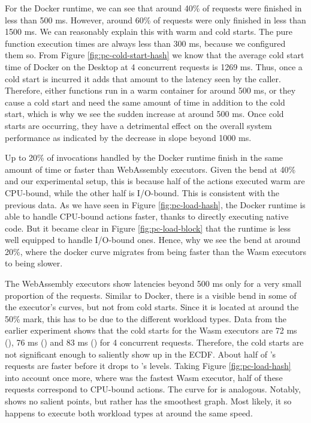 For the Docker runtime, we can see that around 40\% of requests were finished in less than 500 ms. However, around 60\% of requests were only finished in less than 1500 ms. We can reasonably explain this with warm and cold starts. The pure function execution times are always less than 300 ms, because we configured them so. From Figure \ref{fig:pc-cold-start-hash} we know that the average cold start time of Docker on the Desktop at 4 concurrent requests is 1269 ms. Thus, once a cold start is incurred it adds that amount to the latency seen by the caller. Therefore, either functions run in a warm container for around 500 ms, or they cause a cold start and need the same amount of time in addition to the cold start, which is why we see the sudden increase at around 500 ms. Once cold starts are occurring, they have a detrimental effect on the overall system performance as indicated by  the decrease in slope beyond 1000 ms.

Up to 20\% of invocations handled by the Docker runtime finish in the same amount of time or faster than WebAssembly executors. Given the bend at 40\% and our experimental setup, this is because half of the actions executed warm are CPU-bound, while the other half is I/O-bound. This is consistent with the previous data. As we have seen in Figure \ref{fig:pc-load-hash}, the Docker runtime is able to handle CPU-bound actions faster, thanks to directly executing native code. But it became clear in Figure \ref{fig:pc-load-block} that the runtime is less well equipped to handle I/O-bound ones. Hence, why we see the bend at around 20\%, where the docker curve migrates from being faster than the Wasm executors to being slower.

The WebAssembly executors show latencies beyond 500 ms only for a very small proportion of the requests.
Similar to Docker, there is a visible bend in some of the executor's curves, but not from cold starts. Since it is located at around the 50\% mark, this has to be due to the different workload types. Data from the earlier experiment shows that the cold starts for the Wasm executors are 72 ms (), 76 ms () and 83 ms () for 4 concurrent requests. Therefore, the cold starts are not significant enough to saliently show up in the ECDF.
About half of 's requests are faster before it drops to 's levels. Taking Figure \ref{fig:pc-load-hash} into account once more, where  was the fastest Wasm executor, half of these requests correspond to CPU-bound actions. The curve for  is analogous. Notably,  shows no salient points, but rather has the smoothest graph. Most likely, it so happens to execute both workload types at around the same speed.

